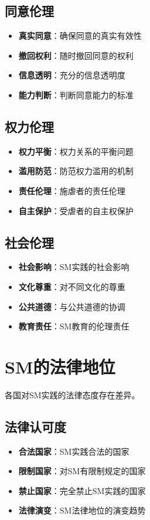 \documentclass[12pt,UTF8]{ctexbook}
\begin{document}
\subsection{同意伦理}
\begin{itemize}[leftmargin=2cm]
	\item \textbf{真实同意}：确保同意的真实有效性
	\item \textbf{撤回权利}：随时撤回同意的权利
	\item \textbf{信息透明}：充分的信息透明度
	\item \textbf{能力判断}：判断同意能力的标准
\end{itemize}

\subsection{权力伦理}
\begin{itemize}[leftmargin=2cm]
	\item \textbf{权力平衡}：权力关系的平衡问题
	\item \textbf{滥用防范}：防范权力滥用的机制
	\item \textbf{责任伦理}：施虐者的责任伦理
	\item \textbf{自主保护}：受虐者的自主权保护
\end{itemize}

\subsection{社会伦理}
\begin{itemize}[leftmargin=2cm]
	\item \textbf{社会影响}：SM实践的社会影响
	\item \textbf{文化尊重}：对不同文化的尊重
	\item \textbf{公共道德}：与公共道德的协调
	\item \textbf{教育责任}：SM教育的伦理责任
\end{itemize}

\section{SM的法律地位}
各国对SM实践的法律态度存在差异。

\subsection{法律认可度}
\begin{itemize}[leftmargin=2cm]
	\item \textbf{合法国家}：SM实践合法的国家
	\item \textbf{限制国家}：对SM有限制规定的国家
	\item \textbf{禁止国家}：完全禁止SM实践的国家
	\item \textbf{法律演变}：SM法律地位的演变趋势
\end{itemize}
\end{document}

